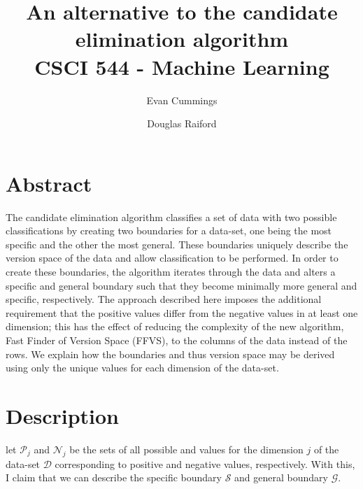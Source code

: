 
\DeclareMathOperator*{\argmax}{arg\,max}

\usepackage[top=.5in, bottom=.5in, left=.5in, right=.5in]{geometry}
\usepackage{framed}
\setlength{\columnsep}{8mm}
\usepackage{natbib}


\small

\title{An alternative to the candidate elimination algorithm \\ 
\vspace{5mm} \large CSCI 544 - Machine Learning}
\author{Evan Cummings \and Douglas Raiford}

\maketitle

\section{Abstract}

The candidate elimination algorithm classifies a set of data with two possible classifications by creating two boundaries for a data-set, one being the most specific and the other the most general.  These boundaries uniquely describe the version space of the data and allow classification to be performed.  In order to create these boundaries, the algorithm iterates through the data and alters a specific and general boundary such that they become minimally more general and specific, respectively.  The approach described here imposes the additional requirement that the positive values differ from the negative values in at least one dimension; this has the effect of reducing the complexity of the new algorithm, Fast Finder of Version Space (FFVS), to the columns of the data instead of the rows.  We explain how the boundaries and thus version space may be derived using only the unique values for each dimension of the data-set.

\section{Description}

let $\mathcal{P}_j$ and $\mathcal{N}_j$ be the sets of all possible and values for the dimension $j$ of the data-set $\mathcal{D}$ corresponding to positive and negative values, respectively.  With this, I claim that we can describe the specific boundary $\mathcal{S}$ and general boundary $\mathcal{G}$.


